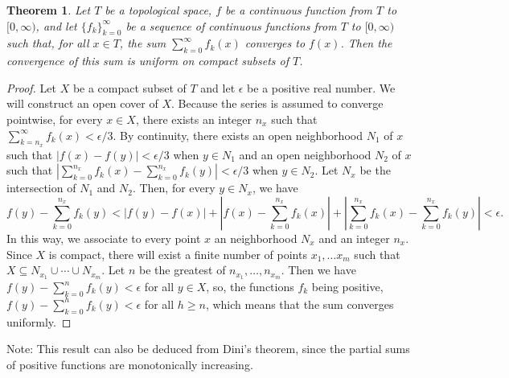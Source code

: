 \documentclass[12pt]{article}
\newtheorem{thm}{Theorem}
\begin{document}
\begin{thm}
Let $T$ be a topological space, $f$ be a continuous function from $T$ to $[0,\infty)$, and 
let $\{f_k\}_{k=0}^\infty$ be a sequence of continuous functions from $T$ to $[0,\infty)$
such that, for all $x \in T$, the sum $\sum_{k=0}^\infty f_k (x)$ converges to $f(x)$.  Then 
the convergence of this sum is uniform on compact subsets of $T$.
\end{thm}

\begin{proof}
Let $X$ be a compact subset of $T$ and let $\epsilon$ be a positive real number.  We will
construct an open cover of $X$.  Because the series is assumed to converge pointwise, for 
every $x \in X$, there exists  an integer $n_x$ such that $\sum_{k=n_x}^\infty f_k (x) < \epsilon 
/ 3$.  By continuity, there exists an open neighborhood $N_1$ of $x$ such that $|f(x) - f(y)| 
< \epsilon /3$ when $y \in N_1$ and an open neighborhood $N_2$ of $x$ such that $\left| 
\sum_{k=0}^{n_x} f_k (x) - \sum_{k=0}^{n_x}  f_k (y) \right| < \epsilon / 3$ when $y \in N_2$.  
Let $N_x$ be the intersection of $N_1$ and $N_2$.  Then, for every $y \in N_x$, we have
\[
 f(y) - \sum_{k=0}^{n_x} f_k (y) < |f(y) - f(x)| + 
                                   \left| f(x) - \sum_{k=0}^{n_x} f_k (x) \right| +
                                   \left| \sum_{k=0}^{n_x} f_k (x) - \sum_{k=0}^{n_x} f_k (y) \right|
                                 < \epsilon .
\]
In this way, we associate to every point $x$ an neighborhood $N_x$ and an integer $n_x$.
Since $X$ is compact, there will exist a finite number of points $x_1, \ldots x_m$ such 
that $X \subseteq N_{x_1} \cup \cdots \cup N_{x_m}$.  Let $n$ be the greatest of $n_{x_1}, 
\ldots, n_{x_m}$.  Then we have $f(y) - \sum_{k=0}^n f_k (y) < \epsilon$ for all $y \in X$,
so, the functions $f_k$ being positive, $f(y) - \sum_{k=0}^h f_k (y) < \epsilon$ for all
$h \ge n$, which means that the sum converges uniformly.
\end{proof}

Note: This result can also be deduced from Dini's theorem, 
since the partial sums of positive functions are monotonically increasing.
\end{document}
